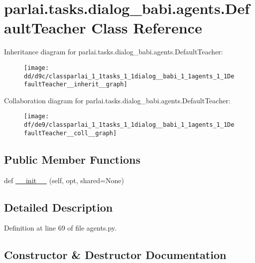 \hypertarget{classparlai_1_1tasks_1_1dialog__babi_1_1agents_1_1DefaultTeacher}{}\section{parlai.\+tasks.\+dialog\+\_\+babi.\+agents.\+Default\+Teacher Class Reference}
\label{classparlai_1_1tasks_1_1dialog__babi_1_1agents_1_1DefaultTeacher}


Inheritance diagram for parlai.\+tasks.\+dialog\+\_\+babi.\+agents.\+Default\+Teacher\+:
\nopagebreak
\begin{figure}[H]
\begin{center}
\leavevmode
\texttt{[image: dd/d9c/classparlai\_1\_1tasks\_1\_1dialog\_\_babi\_1\_1agents\_1\_1DefaultTeacher\_\_inherit\_\_graph]}
\end{center}
\end{figure}


Collaboration diagram for parlai.\+tasks.\+dialog\+\_\+babi.\+agents.\+Default\+Teacher\+:
\nopagebreak
\begin{figure}[H]
\begin{center}
\leavevmode
\texttt{[image: df/de9/classparlai\_1\_1tasks\_1\_1dialog\_\_babi\_1\_1agents\_1\_1DefaultTeacher\_\_coll\_\_graph]}
\end{center}
\end{figure}
\subsection*{Public Member Functions}
\begin{DoxyCompactItemize}
\item 
def \hyperlink{classparlai_1_1tasks_1_1dialog__babi_1_1agents_1_1DefaultTeacher_a973ffa6cd8da99b24a2009f79c4431c4}{\+\_\+\+\_\+init\+\_\+\+\_\+} (self, opt, shared=None)
\end{DoxyCompactItemize}


\subsection{Detailed Description}


Definition at line 69 of file agents.\+py.



\subsection{Constructor \& Destructor Documentation}
\mbox{\label{classparlai_1_1tasks_1_1dialog__babi_1_1agents_1_1DefaultTeacher_a973ffa6cd8da99b24a2009f79c4431c4}} 
